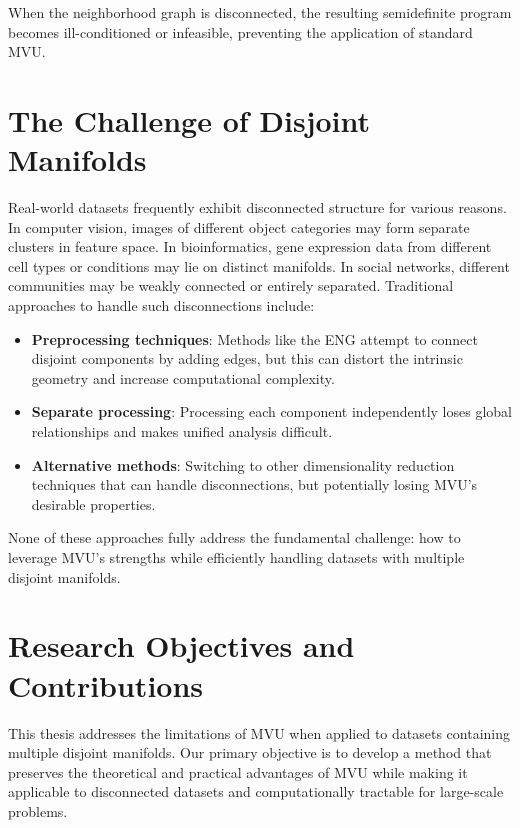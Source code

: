 When the neighborhood graph is disconnected, the resulting semidefinite program becomes ill-conditioned or infeasible, preventing the application of standard \ac{MVU}.

\section{The Challenge of Disjoint Manifolds}

Real-world datasets frequently exhibit disconnected structure for various reasons. In computer vision, images of different object categories may form separate clusters in feature space. In bioinformatics, gene expression data from different cell types or conditions may lie on distinct manifolds. In social networks, different communities may be weakly connected or entirely separated. Traditional approaches to handle such disconnections include:

\begin{itemize}
    \item \textbf{Preprocessing techniques}: Methods like the \ac{ENG} \cite{eng} attempt to connect disjoint components by adding edges, but this can distort the intrinsic geometry and increase computational complexity.
    \item \textbf{Separate processing}: Processing each component independently loses global relationships and makes unified analysis difficult.
    \item \textbf{Alternative methods}: Switching to other dimensionality reduction techniques that can handle disconnections, but potentially losing \ac{MVU}'s desirable properties.
\end{itemize}

None of these approaches fully address the fundamental challenge: how to leverage \ac{MVU}'s strengths while efficiently handling datasets with multiple disjoint manifolds.

\section{Research Objectives and Contributions}

This thesis addresses the limitations of \ac{MVU} when applied to datasets containing multiple disjoint manifolds. Our primary objective is to develop a method that preserves the theoretical and practical advantages of \ac{MVU} while making it applicable to disconnected datasets and computationally tractable for large-scale problems.

